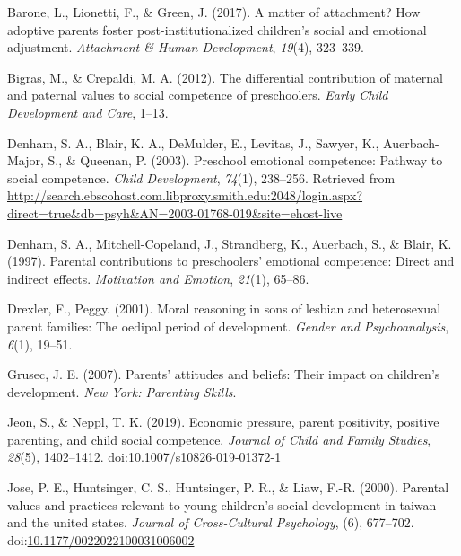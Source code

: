 \documentclass[man]{apa6}
\begin{document}
\hypertarget{refs}{}
\leavevmode\hypertarget{ref-barone2017matter}{}%
Barone, L., Lionetti, F., \& Green, J. (2017). A matter of attachment? How adoptive parents foster post-institutionalized children's social and emotional adjustment. \emph{Attachment \& Human Development}, \emph{19}(4), 323--339.

\leavevmode\hypertarget{ref-bigras2012differential}{}%
Bigras, M., \& Crepaldi, M. A. (2012). The differential contribution of maternal and paternal values to social competence of preschoolers. \emph{Early Child Development and Care}, 1--13.

\leavevmode\hypertarget{ref-Denham_2003}{}%
Denham, S. A., Blair, K. A., DeMulder, E., Levitas, J., Sawyer, K., Auerbach-Major, S., \& Queenan, P. (2003). Preschool emotional competence: Pathway to social competence. \emph{Child Development}, \emph{74}(1), 238--256. Retrieved from \url{http://search.ebscohost.com.libproxy.smith.edu:2048/login.aspx?direct=true\&db=psyh\&AN=2003-01768-019\&site=ehost-live}

\leavevmode\hypertarget{ref-denham1997parental}{}%
Denham, S. A., Mitchell-Copeland, J., Strandberg, K., Auerbach, S., \& Blair, K. (1997). Parental contributions to preschoolers' emotional competence: Direct and indirect effects. \emph{Motivation and Emotion}, \emph{21}(1), 65--86.

\leavevmode\hypertarget{ref-drexler2001moral}{}%
Drexler, F., Peggy. (2001). Moral reasoning in sons of lesbian and heterosexual parent families: The oedipal period of development. \emph{Gender and Psychoanalysis}, \emph{6}(1), 19--51.

\leavevmode\hypertarget{ref-grusec2007parents}{}%
Grusec, J. E. (2007). Parents' attitudes and beliefs: Their impact on children's development. \emph{New York: Parenting Skills}.

\leavevmode\hypertarget{ref-Jeon_Neppl_2019}{}%
Jeon, S., \& Neppl, T. K. (2019). Economic pressure, parent positivity, positive parenting, and child social competence. \emph{Journal of Child and Family Studies}, \emph{28}(5), 1402--1412. doi:\href{https://doi.org/10.1007/s10826-019-01372-1}{10.1007/s10826-019-01372-1}

\leavevmode\hypertarget{ref-Jose_Huntsinger_Huntsinger_Liaw_2000}{}%
Jose, P. E., Huntsinger, C. S., Huntsinger, P. R., \& Liaw, F.-R. (2000). Parental values and practices relevant to young children's social development in taiwan and the united states. \emph{Journal of Cross-Cultural Psychology}, (6), 677--702. doi:\href{https://doi.org/10.1177/0022022100031006002}{10.1177/0022022100031006002}
\end{document}
